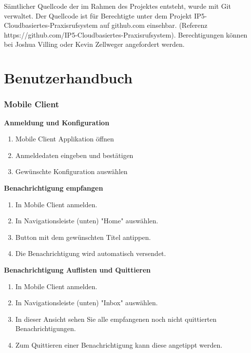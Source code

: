 Sämtlicher Quellcode der im Rahmen des Projektes entsteht, wurde mit Git verwaltet. Der Quellcode ist für Berechtigte unter dem Projekt IP5-Cloudbasiertes-Praxisrufsystem auf github.com einsehbar.
(Referenz https://github.com/IP5-Cloudbasiertes-Praxisrufsystem). Berechtigungen können bei Joshua Villing oder Kevin Zellweger angefordert werden.


\section{Benutzerhandbuch}

\subsubsection*{Mobile Client}

\textbf{Anmeldung und Konfiguration}

\begin{enumerate}
    \item Mobile Client Applikation öffnen
    \item Anmeldedaten eingeben und bestätigen
    \item Gewünschte Konfiguration auswählen
\end{enumerate}

\textbf{Benachrichtigung empfangen}

\begin{enumerate}
    \item In Mobile Client anmelden.
    \item In Navigationsleiste (unten) "Home" auswählen.
    \item Button mit dem gewünschten Titel antippen.
    \item Die Benachrichtigung wird automatisch versendet.
\end{enumerate}

\textbf{Benachrichtigung Auflisten und Quittieren}

\begin{enumerate}
    \item In Mobile Client anmelden.
    \item In Navigationsleiste (unten) "Inbox" auswählen.
    \item In dieser Ansicht sehen Sie alle empfangenen noch nicht quittierten Benachrichtigungen.
    \item Zum Quittieren einer Benachrichtigung kann diese angetippt werden.
\end{enumerate}

